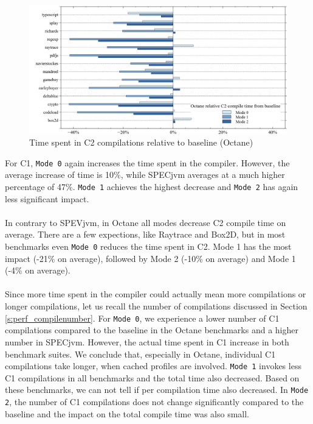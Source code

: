 \begin{figure}[ht]
  \begin{center}
    \centering
    \includegraphics[width=1.0\textwidth]{figures/octane_variation_compiletime_c2.png}
    \caption{Time spent in C2 compilations relative to baseline (Octane)}
    \label{f:octane_variation_compiletime_c2}
  \end{center}
\end{figure}
For C1, \texttt{Mode 0} again increases the time spent in the compiler. However, the average increase of time is 10\%, while SPECjvm averages at a much higher percentage of 47\%.
\texttt{Mode 1} achieves the highest decrease and \texttt{Mode 2} has again less significant impact.
\\\\
In contrary to SPEVjvm, in Octane all modes decrease C2 compile time on average. There are a few expections, like Raytrace and Box2D, but in most benchmarks even \texttt{Mode 0} reduces the time spent in C2. Mode 1 has the most impact (-21\% on average), followed by Mode 2 (-10\% on average) and Mode 1 (-4\% on average).
\\\\
Since more time spent in the compiler could actually mean more compilations or longer compilations, let us recall the number of compilations discussed in Section \ref{s:perf_compilenumber}. For \texttt{Mode 0}, we experience a lower number of C1 compilations compared to the baseline in the Octane benchmarks and a higher number in SPECjvm. However, the actual time spent in C1 increase in both benchmark suites. We conclude that, especially in Octane, individual C1 compilations take longer, when cached profiles are involved. \texttt{Mode 1} invokes less C1 compilations in all benchmarks and the total time also decreased. Based on these benchmarks, we can not tell if per compilation time also decreased. In \texttt{Mode 2}, the number of C1 compilations does not change significantly compared to the baseline and the impact on the total compile time was also small.
